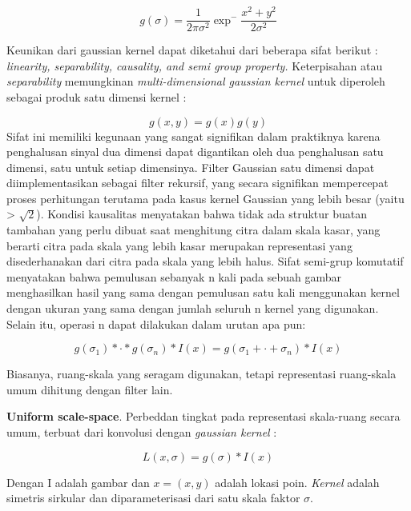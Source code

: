 \begin{equation*}
g(\sigma) = \frac{1}{2\pi\sigma^2}\exp^-\frac{x^2+y^2}{2\sigma^2}
\end{equation*}

Keunikan dari gaussian kernel dapat diketahui dari beberapa sifat berikut : 
\emph{linearity, separability, causality, and semi group property.} Keterpisahan 
atau \emph{separability} memungkinan \emph{multi-dimensional gaussian kernel} 
untuk diperoleh sebagai produk satu dimensi kernel : 

\begin{equation*}
  g(x,y) = g(x)g(y)
\end{equation*}
Sifat ini memiliki kegunaan yang sangat signifikan dalam praktiknya karena penghalusan sinyal dua dimensi 
dapat digantikan oleh dua penghalusan satu dimensi, satu untuk setiap dimensinya. 
Filter Gaussian satu dimensi dapat diimplementasikan sebagai filter rekursif, yang secara signifikan mempercepat proses 
perhitungan terutama pada kasus kernel Gaussian yang lebih besar (yaitu > \( \sqrt{2}\)). 
Kondisi kausalitas menyatakan bahwa tidak ada struktur buatan tambahan yang perlu dibuat saat menghitung citra dalam skala kasar, 
yang berarti citra pada skala yang lebih kasar merupakan representasi yang disederhanakan dari citra pada skala yang lebih halus. 
Sifat semi-grup komutatif menyatakan bahwa pemulusan sebanyak n kali pada sebuah gambar menghasilkan hasil yang sama dengan pemulusan satu kali 
menggunakan kernel dengan ukuran yang sama dengan jumlah seluruh n kernel yang digunakan. 
Selain itu, operasi n dapat dilakukan dalam urutan apa pun:

\begin{equation*}
g(\sigma_{1}) * \cdot * g(\sigma_{n}) * I(x) = g(\sigma_{1} + \cdot + \sigma_{n}) * I(x)
\end{equation*}

Biasanya, ruang-skala yang seragam digunakan, tetapi representasi ruang-skala umum dihitung dengan filter lain.

\textbf{Uniform scale-space}. Perbeddan tingkat pada representasi skala-ruang
secara umum, terbuat dari konvolusi dengan \emph{gaussian kernel} :

\begin{equation*}
L(x,\sigma) = g(\sigma) * I(x)
\end{equation*}

Dengan I adalah gambar dan \(x = (x,y)\) adalah lokasi poin.
\emph{Kernel} adalah simetris sirkular dan diparameterisasi dari satu skala faktor \(\sigma \).

